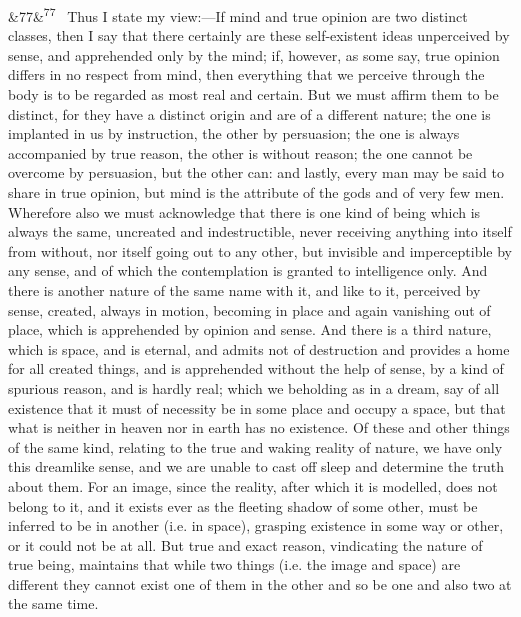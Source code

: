 \documentclass[12pt]{article}
\newcommand{\para}[1][]{\par\noindent\ifx&#1&\else\textsuperscript{\footnotesize #1}~\fi}
\begin{document}
\para[77] Thus I state my view:---If mind and true opinion are two distinct classes, then I say that there certainly are these self-existent ideas unperceived by sense, and apprehended only by the mind; if, however, as some say, true opinion differs in no respect from mind, then everything that we perceive through the body is to be regarded as most real and certain. But we must affirm them to be distinct, for they have a distinct origin and are of a different nature; the one is implanted in us by instruction, the other by persuasion; the one is always accompanied by true reason, the other is without reason; the one cannot be overcome by persuasion, but the other can: and lastly, every man may be said to share in true opinion, but mind is the attribute of the gods and of very few men. Wherefore also we must acknowledge that there is one kind of being which is always the same, uncreated and indestructible, never receiving anything into itself from without, nor itself going out to any other, but invisible and imperceptible by any sense, and of which the contemplation is granted to intelligence only. And there is another nature of the same name with it, and like to it, perceived by sense, created, always in motion, becoming in place and again vanishing out of place, which is apprehended by opinion and sense. And there is a third nature, which is space, and is eternal, and admits not of destruction and provides a home for all created things, and is apprehended without the help of sense, by a kind of spurious reason, and is hardly real; which we beholding as in a dream, say of all existence that it must of necessity be in some place and occupy a space, but that what is neither in heaven nor in earth has no existence. Of these and other things of the same kind, relating to the true and waking reality of nature, we have only this dreamlike sense, and we are unable to cast off sleep and determine the truth about them. For an image, since the reality, after which it is modelled, does not belong to it, and it exists ever as the fleeting shadow of some other, must be inferred to be in another (i.e. in space), grasping existence in some way or other, or it could not be at all. But true and exact reason, vindicating the nature of true being, maintains that while two things (i.e. the image and space) are different they cannot exist one of them in the other and so be one and also two at the same time.
\end{document}
